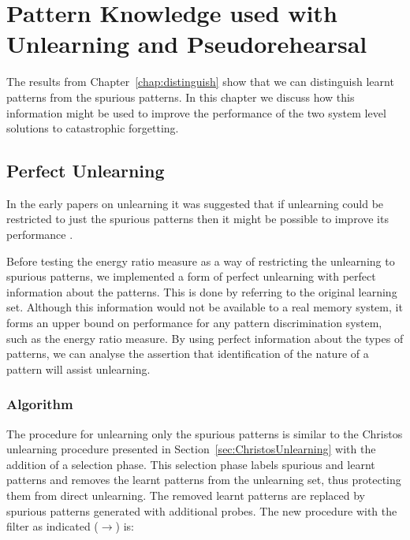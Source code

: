 \chapter{Pattern Knowledge used with Unlearning and Pseudorehearsal}
\label{chap:Enhancing}

The results from Chapter~\ref{chap:distinguish} show that we can distinguish learnt patterns from the spurious patterns.  In this chapter we discuss how this information might be used to improve the performance of the two system level solutions to catastrophic forgetting.


\section{Perfect Unlearning}
\label{sec:PerfectUnlearning}

In the early papers on unlearning it was suggested that if unlearning could be restricted to just the spurious patterns then it might be possible to improve its performance \citep{Hopfield83,vanHemmen1997}.  

Before testing the energy ratio measure as a way of restricting the unlearning to spurious patterns, we implemented a form of perfect unlearning with perfect information about the patterns.  This is done by referring to the original learning set.  Although this information would not be available to a real memory system, it forms an upper bound on performance for any pattern discrimination system, such as the energy ratio measure. By using perfect information about the types of patterns, we can analyse the assertion that identification of the nature of a pattern will assist unlearning.

\subsection{Algorithm}

The procedure for unlearning only the spurious patterns is similar to the Christos unlearning procedure presented in Section~\ref{sec:ChristosUnlearning} with the addition of a selection phase.  This selection phase labels spurious and learnt patterns and removes the learnt patterns from the unlearning set, thus protecting them from direct unlearning.  The removed learnt patterns are replaced by spurious patterns generated with additional probes.  The new procedure with the filter as indicated ($\rightarrow$) is:

